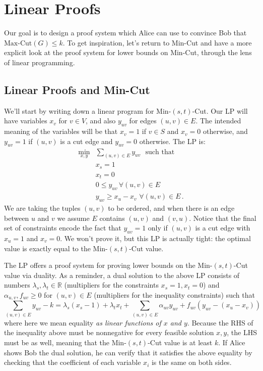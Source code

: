 \documentclass[11pt]{article}
\newcommand{\R}{\mathbb{R}} %
\begin{document}
\section{Linear Proofs}
Our goal is to design a proof system which Alice can use to convince Bob that $\text{Max-Cut}(G) \leq k$.
To get inspiration, let's return to Min-Cut and have a more explicit look at the proof system for lower bounds on Min-Cut, through the lens of linear programming.

\subsection{Linear Proofs and Min-Cut}
We'll start by writing down a linear program for Min-$(s,t)$-Cut.
Our LP will have variables $x_v$ for $v \in V$, and also $y_{uv}$ for edges $(u,v) \in E$.
The intended meaning of the variables will be that $x_v = 1$ if $v \in S$ and $x_v = 0$ otherwise, and $y_{uv} = 1$ if $(u,v)$ is a cut edge and $y_{uv} = 0$ otherwise.
The LP is:
\begin{align}
\min_{x,y} & \sum_{(u,v) \in E} y_{uv} \, \, \text{ such that } \\
& x_s = 1 \\
& x_t = 0 \\
& 0 \leq y_{uv} \, \forall (u,v) \in E\\
& y_{uv} \geq x_u - x_v  \, \, \forall (u,v) \in E \, .
\end{align}
We are taking the tuples $(u,v)$ to be ordered, and when there is an edge between $u$ and $v$ we assume $E$ contains $(u,v)$ and $(v,u)$.
Notice that the final set of constraints encode the fact that $y_{uv} = 1$ only if $(u,v)$ is a cut edge with $x_u = 1$ and $x_v = 0$.
We won't prove it, but this LP is actually tight: the optimal value is exactly equal to the Min-$(s,t)$-Cut value.

The LP offers a proof system for proving lower bounds on the Min-$(s,t)$-Cut value via duality.
As a reminder, a dual solution to the above LP consists of numbers $\lambda_s, \lambda_t \in \R$ (multipliers for the constraints $x_s = 1, x_t = 0$) and $\alpha_{u,v}, f_{uv} \geq 0$ for $(u,v) \in E$ (multipliers for the inequality constraints) such that
\[
  \sum_{(u,v) \in E} y_{uv} - k = \lambda_s(x_s-1) + \lambda_t x_t + \sum_{(u,v) \in E} \alpha_{uv} y_{uv} + f_{uv}(y_{uv} - (x_u - x_v)) \, 
\]
where here we mean equality \emph{as linear functions of $x$ and $y$}.
Because the RHS of the inequality above must be nonnegative for every feasible solution $x,y$, the LHS must be as well, meaning that the Min-$(s,t)$-Cut value is at least $k$.
If Alice shows Bob the dual solution, he can verify that it satisfies the above equality by checking that the coefficient of each variable $x_i$ is the same on both sides.
\end{document}
